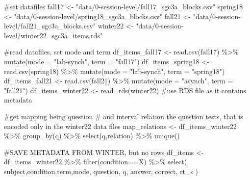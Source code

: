 \documentclass[
  letterpaper,
  DIV=11,
  numbers=noendperiod]{scrreprt}
\newenvironment{Shaded}{\begin{snugshade}}{\end{snugshade}}
\newcommand{\AttributeTok}[1]{\textcolor[rgb]{0.40,0.45,0.13}{#1}}
\newcommand{\CommentTok}[1]{\textcolor[rgb]{0.37,0.37,0.37}{#1}}
\newcommand{\FunctionTok}[1]{\textcolor[rgb]{0.28,0.35,0.67}{#1}}
\newcommand{\NormalTok}[1]{\textcolor[rgb]{0.00,0.23,0.31}{#1}}
\newcommand{\OtherTok}[1]{\textcolor[rgb]{0.00,0.23,0.31}{#1}}
\newcommand{\SpecialCharTok}[1]{\textcolor[rgb]{0.37,0.37,0.37}{#1}}
\newcommand{\StringTok}[1]{\textcolor[rgb]{0.13,0.47,0.30}{#1}}
\begin{document}
\begin{Shaded}
\begin{Highlighting}[]
\CommentTok{\#set datafiles}
\NormalTok{fall17 }\OtherTok{\textless{}{-}} \StringTok{"data/0{-}session{-}level/fall17\_sgc3a\_blocks.csv"}
\NormalTok{spring18 }\OtherTok{\textless{}{-}} \StringTok{"data/0{-}session{-}level/spring18\_sgc3a\_blocks.csv"}
\NormalTok{fall21 }\OtherTok{\textless{}{-}} \StringTok{"data/0{-}session{-}level/fall21\_sgc3a\_blocks.csv"}
\NormalTok{winter22 }\OtherTok{\textless{}{-}} \StringTok{"data/0{-}session{-}level/winter22\_sgc3a\_items.rds"}

\CommentTok{\#read datafiles, set mode and term}
\NormalTok{df\_items\_fall17 }\OtherTok{\textless{}{-}} \FunctionTok{read.csv}\NormalTok{(fall17) }\SpecialCharTok{\%\textgreater{}\%} \FunctionTok{mutate}\NormalTok{(}\AttributeTok{mode =} \StringTok{"lab{-}synch"}\NormalTok{, }\AttributeTok{term =} \StringTok{"fall17"}\NormalTok{)}
\NormalTok{df\_items\_spring18 }\OtherTok{\textless{}{-}} \FunctionTok{read.csv}\NormalTok{(spring18) }\SpecialCharTok{\%\textgreater{}\%} \FunctionTok{mutate}\NormalTok{(}\AttributeTok{mode =} \StringTok{"lab{-}synch"}\NormalTok{, }\AttributeTok{term =} \StringTok{"spring18"}\NormalTok{)}
\NormalTok{df\_items\_fall21 }\OtherTok{\textless{}{-}} \FunctionTok{read.csv}\NormalTok{(fall21) }\SpecialCharTok{\%\textgreater{}\%} \FunctionTok{mutate}\NormalTok{(}\AttributeTok{mode =} \StringTok{"asynch"}\NormalTok{, }\AttributeTok{term =} \StringTok{"fall21"}\NormalTok{)}
\NormalTok{df\_items\_winter22 }\OtherTok{\textless{}{-}} \FunctionTok{read\_rds}\NormalTok{(winter22) }\CommentTok{\#use RDS file as it contains metadata}

\CommentTok{\#get mapping being question \# and interval relation the question tests, that is encoded only in the winter22 data files}
\NormalTok{map\_relations }\OtherTok{\textless{}{-}}\NormalTok{ df\_items\_winter22 }\SpecialCharTok{\%\textgreater{}\%} \FunctionTok{group\_by}\NormalTok{(q) }\SpecialCharTok{\%\textgreater{}\%} \FunctionTok{select}\NormalTok{(q,relation) }\SpecialCharTok{\%\textgreater{}\%} \FunctionTok{unique}\NormalTok{()}


\CommentTok{\#SAVE METADATA FROM WINTER, but no rows }
\NormalTok{df\_items }\OtherTok{\textless{}{-}}\NormalTok{ df\_items\_winter22 }\SpecialCharTok{\%\textgreater{}\%} \FunctionTok{filter}\NormalTok{(condition}\SpecialCharTok{==}\StringTok{\textquotesingle{}X\textquotesingle{}}\NormalTok{) }\SpecialCharTok{\%\textgreater{}\%} \FunctionTok{select}\NormalTok{(}
\NormalTok{  subject,condition,term,mode,}
\NormalTok{  question, q, answer, correct, rt\_s}
\NormalTok{) }
  

\end{Highlighting}
\end{Shaded}
\end{document}
